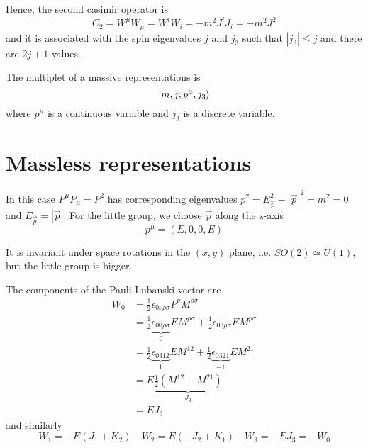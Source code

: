    Hence, the second casimir operator is 
    \begin{equation*}
        C_2 = W^\mu W_\mu = W^i W_i = - m^2 J^i J_i = - m^2 J^2
    \end{equation*}
    and it is associated with the spin eigenvalues $j$ and $j_3$ such that $|j_3| \leq j$ and there are $2j+1$ values. 

    The multiplet of a massive representations is 
    \begin{equation*}
        \vert m, j ; p^\mu, j_3\rangle
    \end{equation*}
    where $p^\mu$ is a continuous variable and $j_3$ is a discrete variable. 

\section{Massless representations}

    In this case $P^\mu P_\mu = P^2$ has corresponding eigenvalues $p^2 = E_{\vec p}^2 - |\vec p|^2 = m^2 = 0$ and $E_{\vec p} = |\vec p|$. For the little group, we choose $\vec p$ along the z-axis
    \begin{equation*}
        p^\mu = (E, 0, 0, E)
    \end{equation*}

    It is invariant under space rotations in the $(x, y)$ plane, i.e. $SO(2) \simeq U(1)$, but the little group is bigger. 

    The components of the Pauli-Lubanski vector are 
    \begin{equation*}
    \begin{aligned}
        W_0 & = \frac{1}{2} \epsilon_{0 \nu \rho \sigma} P^\nu M^{\rho \sigma} \\ & = \frac{1}{2} \underbrace{\epsilon_{0 0 \rho \sigma}}_{0} E M^{\rho \sigma} + \frac{1}{2} \epsilon_{0 3 \rho \sigma} E M^{\rho \sigma} \\ & = \frac{1}{2} \underbrace{\epsilon_{0 3 1 2 }}_{1} E M^{12} + \frac{1}{2} \underbrace{\epsilon_{0 3 21}}_{-1} E M^{21} \\ & = E \underbrace{\frac{1}{2} (M^{12} - M^{21})}_{J_3} \\ & = E J_3
    \end{aligned}
    \end{equation*}
    and similarly
    \begin{equation*}
        W_1 = - E (J_1 + K_2) \quad W_2 = E (- J_2 + K_1) \quad W_3 = - E J_3 = - W_0
    \end{equation*}


